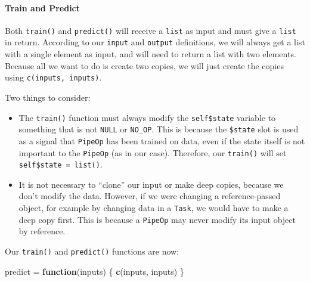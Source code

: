 \documentclass[]{article}
\newenvironment{Shaded}{\begin{snugshade}}{\end{snugshade}}
\newcommand{\ControlFlowTok}[1]{\textcolor[rgb]{0.13,0.29,0.53}{\textbf{#1}}}
\newcommand{\KeywordTok}[1]{\textcolor[rgb]{0.13,0.29,0.53}{\textbf{#1}}}
\newcommand{\NormalTok}[1]{#1}
\newcommand{\OperatorTok}[1]{\textcolor[rgb]{0.81,0.36,0.00}{\textbf{#1}}}
\newcommand{\StringTok}[1]{\textcolor[rgb]{0.31,0.60,0.02}{#1}}
\let\oldparagraph\paragraph
\renewcommand{\paragraph}[1]{\oldparagraph{#1}\mbox{}}
\renewenvironment{Shaded} {\begin{snugshade}\small} {\end{snugshade}}
\begin{document}
\hypertarget{train-and-predict}{%
\paragraph{Train and Predict}\label{train-and-predict}}

Both \texttt{train()} and \texttt{predict()} will receive a \texttt{list} as input and must give a \texttt{list} in return.
According to our \texttt{input} and \texttt{output} definitions, we will always get a list with a single element as input, and will need to return a list with two elements. Because all we want to do is create two copies, we will just create the copies using \texttt{c(inputs,\ inputs)}.

Two things to consider:

\begin{itemize}
\item
  The \texttt{train()} function must always modify the \texttt{self\$state} variable to something that is not \texttt{NULL} or \texttt{NO\_OP}.
  This is because the \texttt{\$state} slot is used as a signal that \texttt{PipeOp} has been trained on data, even if the state itself is not important to the \texttt{PipeOp} (as in our case).
  Therefore, our \texttt{train()} will set \texttt{self\$state\ =\ list()}.
\item
  It is not necessary to ``clone'' our input or make deep copies, because we don't modify the data.
  However, if we were changing a reference-passed object, for example by changing data in a \texttt{Task}, we would have to make a deep copy first.
  This is because a \texttt{PipeOp} may never modify its input object by reference.
\end{itemize}

Our \texttt{train()} and \texttt{predict()} functions are now:

\begin{Shaded}
\end{Shaded}

\begin{Shaded}
\begin{Highlighting}[]
\NormalTok{predict =}\StringTok{ }\ControlFlowTok{function}\NormalTok{(inputs) \{}
  \KeywordTok{c}\NormalTok{(inputs, inputs)}
\NormalTok{\}}
\end{Highlighting}
\end{Shaded}
\end{document}
